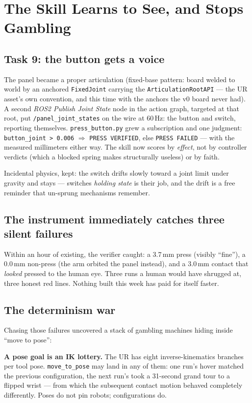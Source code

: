 \chapter{The Skill Learns to See, and Stops Gambling}
\label{ch:verify}

\section{Task 9: the button gets a voice}

The panel became a proper articulation (fixed-base pattern: board welded to world by an
anchored \texttt{FixedJoint} carrying the \texttt{ArticulationRootAPI} --- the UR asset's own
convention, and this time with the anchors the v0 board never had). A second \emph{ROS2
Publish Joint State} node in the action graph, targeted at that root, put
\texttt{/panel\_joint\_states} on the wire at 60\,Hz: the button and switch, reporting
themselves. \texttt{press\_button.py} grew a subscription and one judgment:
\texttt{button\_joint > 0.006} $\Rightarrow$ \texttt{PRESS VERIFIED}, else \texttt{PRESS
FAILED} --- with the measured millimeters either way. The skill now scores by \emph{effect},
not by controller verdicts (which a blocked spring makes structurally useless) or by faith.

Incidental physics, kept: the switch drifts slowly toward a joint limit under gravity and
stays --- switches \emph{holding state} is their job, and the drift is a free reminder that
un-sprung mechanisms remember.

\section{The instrument immediately catches three silent failures}

Within an hour of existing, the verifier caught: a 3.7\,mm press (visibly ``fine''), a
0.0\,mm non-press (the arm orbited the panel instead), and a 3.0\,mm contact that \emph{looked}
pressed to the human eye. Three runs a human would have shrugged at, three honest red lines.
Nothing built this week has paid for itself faster.

\section{The determinism war}

Chasing those failures uncovered a stack of gambling machines hiding inside ``move to pose'':

\begin{lesson}
\textbf{A pose goal is an IK lottery.} The UR has eight inverse-kinematics branches per tool
pose. \texttt{move\_to\_pose} may land in any of them: one run's hover matched the previous
configuration, the next run's took a 31-second grand tour to a flipped wrist --- from which
the subsequent contact motion behaved completely differently. Poses do not pin robots;
configurations do.
\end{lesson}

